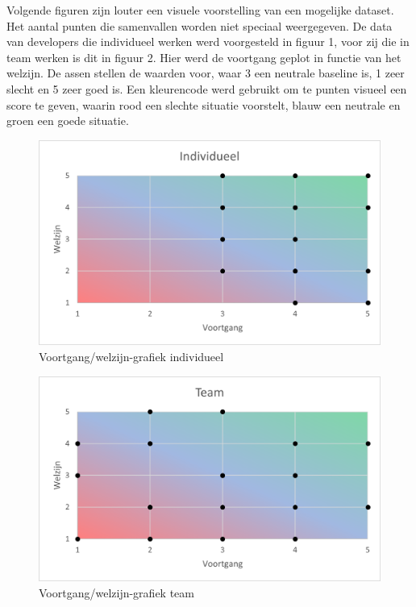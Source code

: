 Volgende figuren zijn louter een visuele voorstelling van een mogelijke dataset. Het aantal punten die samenvallen worden niet speciaal weergegeven. De data van developers die individueel werken werd voorgesteld in figuur 1, voor zij die in team werken is dit in figuur 2. Hier werd de voortgang geplot in functie van het welzijn. De assen stellen de waarden voor, waar 3 een neutrale baseline is, 1 zeer slecht en 5 zeer goed is. Een kleurencode werd gebruikt om te punten visueel een score te geven, waarin rood een slechte situatie voorstelt, blauw een neutrale en groen een goede situatie.

\begin{figure}[!hb]
    \includegraphics[width=\columnwidth]{individueel.png}
    \caption{Voortgang/welzijn-grafiek individueel}
    \label{Voortgang/welzijn-grafiek voor een individuele workflow. Overlappende punten worden hier niet speciaal weergegeven.}
\end{figure}

\begin{figure}[!hb]
    \includegraphics[width=\columnwidth]{team.png}
    \caption{Voortgang/welzijn-grafiek team}
    \label{Voortgang/welzijn-grafiek voor een teamsgebonden workflow. Overlappende punten worden hier niet speciaal weergegeven.}
\end{figure}

